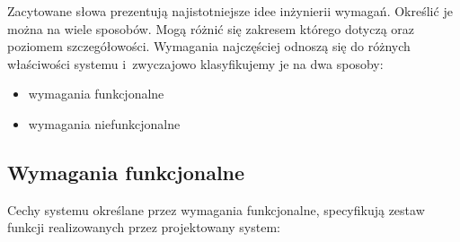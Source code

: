 \documentclass[a4paper,12pt,oneside]{mwrep}  %
\begin{document}
Zacytowane słowa prezentują najistotniejsze idee inżynierii wymagań. Określić je można na wiele sposobów. Mogą różnić się zakresem którego dotyczą oraz poziomem szczegółowości. Wymagania najczęściej odnoszą się do różnych właściwości systemu i~zwyczajowo klasyfikujemy je na dwa sposoby:
\begin{itemize}
\item wymagania funkcjonalne
\item wymagania niefunkcjonalne
\end{itemize}

\subsection{Wymagania funkcjonalne}
Cechy systemu określane przez wymagania funkcjonalne, specyfikują zestaw funkcji realizowanych przez projektowany system:\\
\end{document}
